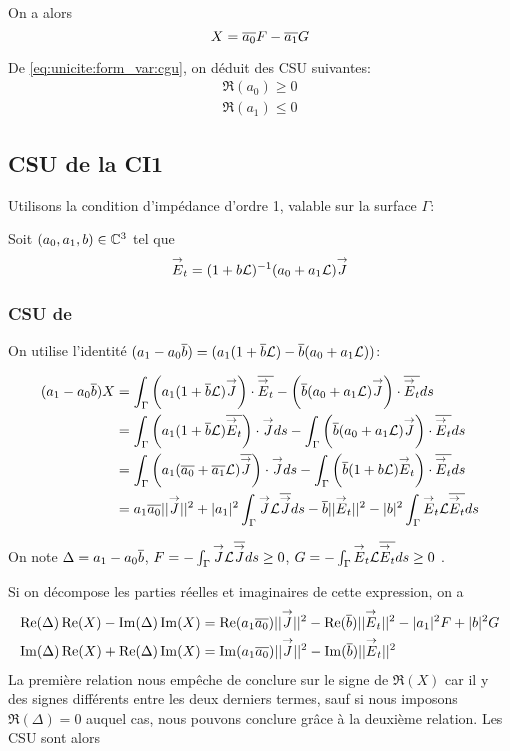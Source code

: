     On a alors
    \begin{equation*}
      X = \conj{a_0}F - \conj{a_1}G
    \end{equation*}

    De \eqref{eq:unicite:form_var:cgu}, on déduit des CSU suivantes:
    \begin{align}
      \Re\left(a_0\right) \ge 0\\
      \Re\left(a_1\right) \le 0
    \end{align}
  \subsection{CSU de la CI1}

    Utilisons la condition d’impédance d'ordre 1, valable sur la surface \(\Gamma\):

    Soit \((a_0, a_1,b) \in \CC^3\) tel que
    \[
      \vE_t = (1 + b \LL)^{-1} (a_0 + a_1 \LL) \vJ
    \]

    \subsubsection{CSU de \cite{stupfel_sufficient_2011}}

      On utilise l'identité \((a_1-a_0\conj{b}) = (a_1(1+\conj{b}\LL) - \conj{b}(a_0+a_1\LL))\):

      \begin{align*}
        (a_1-a_0\conj{b})X &= \int_\Gamma \left(a_1(1+\conj{b}\LL) \vJ\right)\cdot\conj{\vE_t} - \left(\conj{b}(a_0+a_1 \LL)\vJ\right)\cdot\conj{\vE_t} ds\\
        &= \int_\Gamma \left(a_1(1+\conj{b}\LL) \conj{\vE_t}\right)\cdot\vJ ds - \int_\Gamma \left(\conj{b}(a_0+a_1 \LL)\vJ\right)\cdot\conj{\vE_t} ds\\
        &= \int_\Gamma \left(a_1(\conj{a_0}+\conj{a_1}\LL) \conj{\vJ}\right)\cdot\vJ ds  - \int_\Gamma \left(\conj{b}(1+b \LL)\vE_t\right)\cdot\conj{\vE_t} ds\\
        &= a_1\conj{a_0} ||\vJ||^2 + |a_1|^2 \int_\Gamma \vJ \LL \conj{\vJ} ds - \conj{b} ||\vE_t||^2 - |b|^2 \int_\Gamma \vE_t \LL \conj{\vE_t} ds
      \end{align*}

      On note \(\Delta = a_1 -a_0\conj{b}\), \(F = -\int_\Gamma \vJ \LL \conj{\vJ} ds \ge 0 \), \(G = -\int_\Gamma \vE_t \LL \conj{\vE_t} ds \ge 0 \) .

      Si on décompose les parties réelles et imaginaires de cette expression, on a
      \begin{align*}
        \Re(\Delta)\Re(X) - \Im(\Delta)\Im(X) &= \Re(a_1\conj{a_0}) ||\vJ||^2 - \Re(\conj{b})||\vE_t||^2 -|a_1|^2 F + |b|^2 G \\
        \Im(\Delta)\Re(X) + \Re(\Delta)\Im(X) &= \Im(a_1\conj{a_0}) ||\vJ||^2 - \Im(\conj{b})||\vE_t||^2
      \end{align*}
      La première relation nous empêche de conclure sur le signe de \(\Re(X)\) car il y des signes différents entre les deux derniers termes, sauf si nous imposons \(\Re( \Delta)= 0\) auquel cas, nous pouvons conclure grâce à la deuxième relation. Les CSU sont alors

